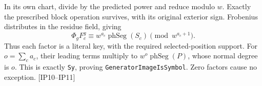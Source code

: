 In its own chart, divide by the predicted power and reduce modulo $w$. Exactly the prescribed block operation survives, with its original exterior sign. Frobenius distributes in the residue field, giving
\[
 \Phi_gF_c^g\equiv w^{a_c}\operatorname{phSeg}(S_c)
                 \pmod{w^{a_c+1}}.
 \tag{IP.6}
\]
Thus each factor is a literal key, with the required selected-position support. For $o=\sum_ca_c$, their leading terms multiply to $w^o\operatorname{phSeg}(P)$, whose normal degree is $o$. This is exactly \texttt{Sy}, proving \texttt{GeneratorImageIsSymbol}. Zero factors cause no exception. \textsf{[IP10--IP11]}

